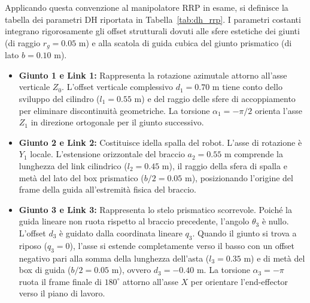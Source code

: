 \documentclass[11pt, a4paper]{report}
\begin{document}
Applicando questa convenzione al manipolatore RRP in esame, si definisce la tabella dei parametri DH riportata in Tabella~\ref{tab:dh_rrp}. I parametri costanti integrano rigorosamente gli offset strutturali dovuti alle sfere estetiche dei giunti (di raggio \(r_{g} = 0.05\) m) e alla scatola di guida cubica del giunto prismatico (di lato \(b = 0.10\) m).

\begin{table}[h!]
    \centering
    \caption{Parametri di Denavit-Hartenberg per il manipolatore RRP.}
    \label{tab:dh_rrp}
\end{table}

\begin{itemize}
    \item \textbf{Giunto 1 e Link 1:} Rappresenta la rotazione azimutale attorno all'asse verticale \(Z_0\). L'offset verticale complessivo \(d_1 = 0.70\) m tiene conto dello sviluppo del cilindro (\(l_1 = 0.55\) m) e del raggio delle sfere di accoppiamento per eliminare discontinuità geometriche. La torsione \(\alpha_1 = -\pi/2\) orienta l'asse \(Z_1\) in direzione ortogonale per il giunto successivo.
    \newpage
    \item \textbf{Giunto 2 e Link 2:} Costituisce idella spalla del robot. L'asse di rotazione è \(Y_1\) locale. L'estensione orizzontale del braccio \(a_2 = 0.55\) m comprende la lunghezza del link cilindrico (\(l_2 = 0.45\) m), il raggio della sfera di spalla e metà del lato del box prismatico (\(b/2 = 0.05\) m), posizionando l'origine del frame della guida all'estremità fisica del braccio.

    \item \textbf{Giunto 3 e Link 3:} Rappresenta lo stelo prismatico scorrevole. Poiché la guida lineare non ruota rispetto al braccio precedente, l'angolo \(\theta_3\) è nullo. L'offset \(d_3\) è guidato dalla coordinata lineare \(q_3\). Quando il giunto si trova a riposo (\(q_3 = 0\)), l'asse si estende completamente verso il basso con un offset negativo pari alla somma della lunghezza dell'asta (\(l_3 = 0.35\) m) e di metà del box di guida (\(b/2 = 0.05\) m), ovvero \(d_3 = -0.40\) m. La torsione \(\alpha_3 = -\pi\) ruota il frame finale di \(180^\circ\) attorno all'asse \(X\) per orientare l'end-effector verso il piano di lavoro.
\end{itemize}
\end{document}
